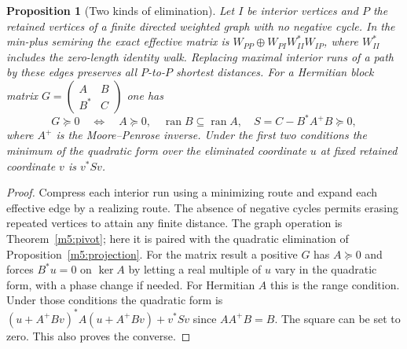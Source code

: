 \documentclass[11pt,reqno]{amsart}
\newtheorem{proposition}[theorem]{Proposition}
\theoremstyle{definition}
\theoremstyle{remark}
\numberwithin{equation}{section}
\begin{document}
\begin{proposition}[Two kinds of elimination]\label{m8:pivots}
Let $I$ be interior vertices and $P$ the retained vertices of a
finite directed weighted graph with no negative cycle. In the
min-plus semiring the exact effective matrix is
$W_{PP}\oplus W_{PI}W_{II}^{*}W_{IP}$, where $W_{II}^{*}$ includes
the zero-length identity walk. Replacing maximal interior runs of
a path by these edges preserves all $P$-to-$P$ shortest distances.
For a Hermitian block matrix
$G=\left(\begin{smallmatrix}A&B\\B^*&C\end{smallmatrix}\right)$
one has
\[
 G\succeq0\quad\Longleftrightarrow\quad
 A\succeq0,\quad \operatorname{ran}B\subseteq\operatorname{ran}A,
 \quad S=C-B^*A^+B\succeq0 ,
\]
where $A^+$ is the Moore--Penrose inverse. Under the first two
conditions the minimum of the quadratic form over the eliminated
coordinate $u$ at fixed retained coordinate $v$ is $v^*Sv$.
\end{proposition}
\begin{proof}
Compress each interior run using a minimizing route and expand each
effective edge by a realizing route. The absence of negative cycles
permits erasing repeated vertices to attain any finite distance.
The graph operation is Theorem~\ref{m5:pivot}; here it is
paired with the quadratic elimination of Proposition~\ref{m5:projection}.
For the matrix result a positive $G$ has $A\succeq0$ and forces
$B^*u=0$ on $\ker A$ by letting a real multiple of $u$ vary in
the quadratic form, with a phase change if needed. For Hermitian
$A$ this is the range condition. Under those conditions the
quadratic form is
$(u+A^+Bv)^*A(u+A^+Bv)+v^*Sv$ since $AA^+B=B$.
The square can be set to zero. This also proves the converse.
\end{proof}
\end{document}
